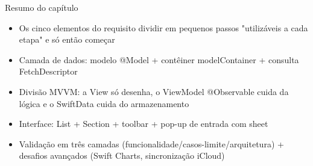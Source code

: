\begin{tcbsummary}{Resumo do capítulo}
\begin{itemize}
  \item Os cinco elementos do requisito dividir em pequenos passos "utilizáveis a cada etapa" e só então começar
  \item Camada de dados: modelo @Model + contêiner modelContainer + consulta FetchDescriptor
  \item Divisão MVVM: a View só desenha, o ViewModel @Observable cuida da lógica e o SwiftData cuida do armazenamento
  \item Interface: List + Section + toolbar + pop-up de entrada com sheet
  \item Validação em três camadas (funcionalidade/casos-limite/arquitetura) + desafios avançados (Swift Charts, sincronização iCloud)
\end{itemize}

\end{tcbsummary}
